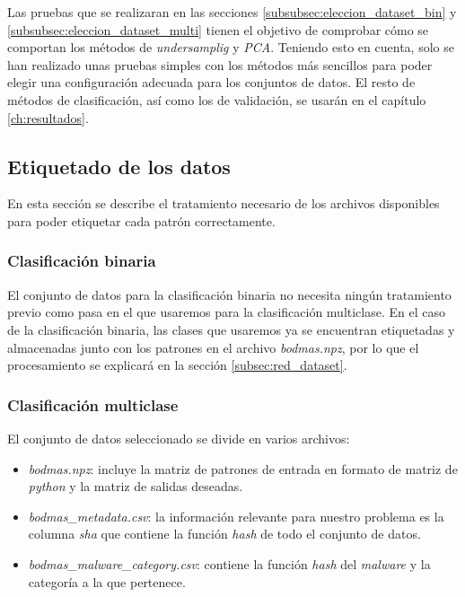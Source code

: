 \vspace{1em}

Las pruebas que se realizaran en las secciones \ref{subsubsec:eleccion_dataset_bin} y \ref{subsubsec:eleccion_dataset_multi} tienen el objetivo de comprobar cómo se comportan los métodos de \textit{undersamplig} y \textit{PCA}. Teniendo esto en cuenta, solo se han realizado unas pruebas simples con los métodos más sencillos para poder elegir una configuración adecuada para los conjuntos de datos. El resto de métodos de clasificación, así como los de validación, se usarán en el capítulo \ref{ch:resultados}.

\subsection{Etiquetado de los datos}
\label{subsec:etiquetado}

En esta sección se describe el tratamiento necesario de los archivos disponibles para poder etiquetar cada patrón correctamente.

\subsubsection{Clasificación binaria}
\label{subsubsec:bin}

El conjunto de datos para la clasificación binaria no necesita ningún tratamiento previo como pasa en el que usaremos para la clasificación multiclase. En el caso de la clasificación binaria, las clases que usaremos ya se encuentran etiquetadas y almacenadas junto con los patrones en el archivo \textit{bodmas.npz}, por lo que el procesamiento se explicará en la sección \ref{subsec:red_dataset}.

\newpage
\subsubsection{Clasificación multiclase}
\label{subsubsec:multiclass}

El conjunto de datos seleccionado se divide en varios archivos:

\begin{itemize}
	\item \textit{bodmas.npz}: incluye la matriz de patrones de entrada en formato de matriz de \textit{python} y la matriz de salidas deseadas.
	\item \textit{bodmas\_metadata.csv}: la información relevante para nuestro problema es la columna \textit{sha} que contiene la función \textit{hash} de todo el conjunto de datos.
	\item \textit{bodmas\_malware\_category.csv}: contiene la función \textit{hash} del \textit{malware} y la categoría a la que pertenece.
\end{itemize}

